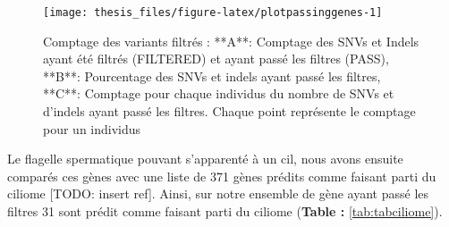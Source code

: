 \documentclass[12pt,twoside]{reedthesis}
\theoremstyle{definition}
\theoremstyle{definition}
\theoremstyle{remark}
\begin{document}
  \begin{figure}
  
  {\centering \texttt{[image: thesis\_files/figure-latex/plotpassinggenes-1]} 
  
  }
  
  \caption[Analyse des gènes passant les filtres]{Comptage des variants filtrés  :  **A**: Comptage des SNVs et Indels ayant été filtrés (FILTERED) et ayant passé les filtres (PASS), **B**: Pourcentage des SNVs et indels ayant passé les filtres, **C**: Comptage pour chaque individus du nombre de SNVs et d'indels ayant passé les filtres. Chaque point représente le comptage pour un individus}\label{fig:plotpassinggenes}
  \end{figure}
  
  Le flagelle spermatique pouvant s'apparenté à un cil, nous avons ensuite
  comparés ces gènes avec une liste de 371 gènes prédits comme faisant
  parti du ciliome {[}TODO: insert ref{]}. Ainsi, sur notre ensemble de
  gène ayant passé les filtres 31 sont prédit comme faisant parti du
  ciliome (\textbf{Table :} \ref{tab:tabciliome}).
  
\end{document}

